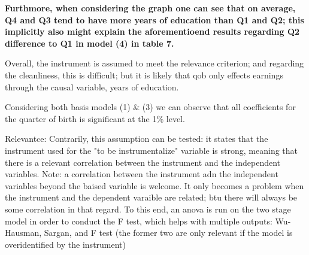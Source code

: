 \documentclass[a4paper]{article}
\begin{document}
\textbf{Furthmore, when considering the graph one can see that on average, Q4 and Q3 tend to have more years of education than Q1 and Q2; this implicitly also might explain the aforementioend results regarding Q2 difference to Q1 in model (4) in table 7.}

Overall, the instrument is assumed to meet the relevance criterion; and regarding the cleanliness, this is difficult; but it is likely that qob only effects earnings through the causal variable, years of education.





Considering both basis models (1) \& (3) we can observe that all coefficients for the quarter of birth is significant at the 1\% level. 






Relevantce: Contrarily, this assumption can be tested: it states that the instrument used for the "to be instrumentalize" variable is strong, meaning that there is a relevant correlation between the instrument and the independent variables. Note: a correlation between the instrument adn the independent variables beyond the baised variable is welcome. It only becomes a problem when the instrument and the dependent varaible are related; btu there will always be some correlation in that regard. To this end, an anova is run on the two stage model in order to conduct the F test, which helps with multiple outputs: Wu-Hausman, Sargan, and F test (the former two are only relevant if the model is overidentified by the instrument)
\end{document}
